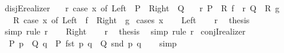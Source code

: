 \begin{isabellebody}
%
\endisadelimproof
\isanewline
{}\isamarkupfalse%
\ disjE{\isacharunderscore}{\kern0pt}realizer{}{\isacharcolon}{\kern0pt}\isanewline
\ \ \ r{\isacharcolon}{\kern0pt}\ {\isachardoublequoteopen}case\ x\ of\ Left\ {\isasymRightarrow}\ P\ {\isacharbar}{\kern0pt}\ Right\ {\isasymRightarrow}\ Q{\isachardoublequoteclose}\isanewline
\ \ \ r{}{\isacharcolon}{\kern0pt}\ {\isachardoublequoteopen}P\ {\isasymLongrightarrow}\ R\ f{\isachardoublequoteclose}\ \ r{}{\isacharcolon}{\kern0pt}\ {\isachardoublequoteopen}Q\ {\isasymLongrightarrow}\ R\ g{\isachardoublequoteclose}\isanewline
\ \ \ {\isachardoublequoteopen}R\ {\isacharparenleft}{\kern0pt}case\ x\ of\ Left\ {\isasymRightarrow}\ f\ {\isacharbar}{\kern0pt}\ Right\ {\isasymRightarrow}\ g{\isacharparenright}{\kern0pt}{\isachardoublequoteclose}\isanewline
%
\isadelimproof
%
\endisadelimproof
%
\isatagproof
{}\isamarkupfalse%
\ {\isacharparenleft}{\kern0pt}cases\ x{\isacharparenright}{\kern0pt}\isanewline
\ \ \isamarkupfalse%
\ Left\isanewline
\ \ \isamarkupfalse%
\ r\ \isamarkupfalse%
\ {\isacharquery}{\kern0pt}thesis\ \isamarkupfalse%
\ simp\ {\isacharparenleft}{\kern0pt}rule\ r{}{\isacharparenright}{\kern0pt}\isanewline
{}\isamarkupfalse%
\isanewline
\ \ \isamarkupfalse%
\ Right\isanewline
\ \ \isamarkupfalse%
\ r\ \isamarkupfalse%
\ {\isacharquery}{\kern0pt}thesis\ \isamarkupfalse%
\ simp\ {\isacharparenleft}{\kern0pt}rule\ r{}{\isacharparenright}{\kern0pt}\isanewline
{}\isamarkupfalse%
%
\endisatagproof
{\isafoldproof}%
%
\isadelimproof
\isanewline
%
\endisadelimproof
\isanewline
{}\isamarkupfalse%
\ conjI{\isacharunderscore}{\kern0pt}realizer{\isacharcolon}{\kern0pt}\isanewline
\ \ {\isachardoublequoteopen}P\ p\ {\isasymLongrightarrow}\ Q\ q\ {\isasymLongrightarrow}\ P\ {\isacharparenleft}{\kern0pt}fst\ {\isacharparenleft}{\kern0pt}p{\isacharcomma}{\kern0pt}\ q{\isacharparenright}{\kern0pt}{\isacharparenright}{\kern0pt}\ {\isasymand}\ Q\ {\isacharparenleft}{\kern0pt}snd\ {\isacharparenleft}{\kern0pt}p{\isacharcomma}{\kern0pt}\ q{\isacharparenright}{\kern0pt}{\isacharparenright}{\kern0pt}{\isachardoublequoteclose}\isanewline
%
\isadelimproof
\ \ %
\endisadelimproof
%
\isatagproof
{}\isamarkupfalse%
\ simp%
\endisatagproof
{\isafoldproof}%
%
\isadelimproof
\isanewline

\end{isabellebody}
